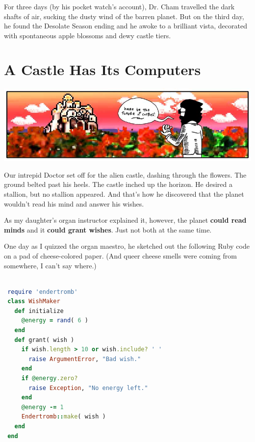 \documentclass[10pt,twoside]{report}
\begin{document}
For three days (by his pocket watch's account), Dr. Cham travelled the
dark shafts of air, sucking the dusty wind of the barren planet. But
on the third day, he found the Desolate Season ending and he awoke to
a brilliant vista, decorated with spontaneous apple blossoms and dewy
castle tiers.


\section{A Castle Has Its Computers}


	\includegraphics[width=1.0\textwidth]{cache/37.png}

Our intrepid Doctor set off for the alien castle, dashing through the
flowers.  The ground belted past his heels.  The castle inched up the
horizon.  He desired a stallion, but no stallion appeared.  And that's
how he discovered that the planet wouldn't read his mind and answer
his wishes.

As my daughter's organ instructor explained it, however, the planet
{\bf could read minds} and it {\bf could grant wishes}.  Just not both
at the same time.

One day as I quizzed the organ maestro, he sketched out the following
Ruby code on a pad of cheese-colored paper.  (And queer cheese smells
were coming from somewhere, I can't say where.)


\begin{lstlisting}[basicstyle=\ttfamily\color{basiccolor},
    commentstyle = \ttfamily\color{commentcolor},
    keywordstyle=\ttfamily\color{keywordscolor},
    stringstyle=\color{stringcolor},
    language=Ruby,
    basicstyle=\small\ttfamily,
    showstringspaces=false,
  ]

 require 'endertromb'
 class WishMaker
   def initialize
     @energy = rand( 6 )
   end
   def grant( wish )
     if wish.length > 10 or wish.include? ' '
       raise ArgumentError, "Bad wish."
     end
     if @energy.zero?
       raise Exception, "No energy left."
     end
     @energy -= 1
     Endertromb::make( wish )
   end
 end

\end{lstlisting}
\end{document}
